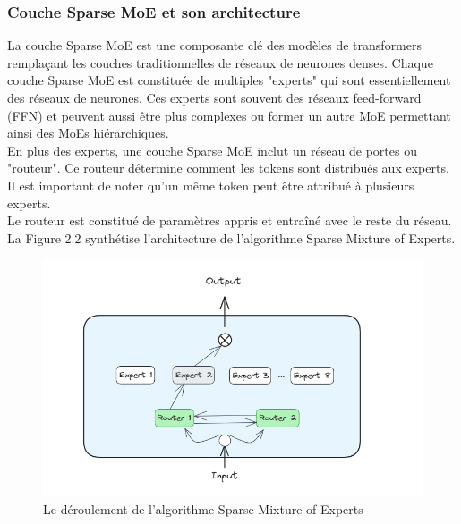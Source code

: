 \subsubsection{Couche Sparse MoE et son architecture}
\justifying
La couche Sparse MoE est une composante clé des modèles de transformers remplaçant les couches traditionnelles de réseaux de neurones denses. Chaque couche Sparse MoE est constituée de multiples "experts" qui sont essentiellement des réseaux de neurones. Ces experts sont souvent des réseaux feed-forward (FFN) et peuvent aussi être plus complexes ou former un autre MoE permettant ainsi des MoEs hiérarchiques.\\
En plus des experts, une couche Sparse MoE inclut un réseau de portes ou "routeur". Ce routeur détermine comment les tokens sont distribués aux experts. Il est important de noter qu'un même token peut être attribué à plusieurs experts.\\
Le routeur est constitué de paramètres appris et entraîné avec le reste du réseau.\\
La Figure 2.2 synthétise l’architecture de l’algorithme Sparse Mixture of Experts.

\begin{figure}[H]
    \centering
    \includegraphics[width=\textwidth]{images/chp2/fig2.png}
    \caption{Le déroulement de l’algorithme Sparse Mixture of Experts}
    \label{fig:architecture sparse moe}    
\end{figure}

